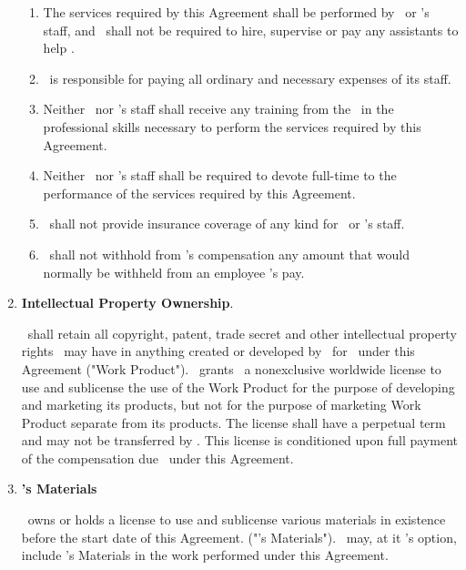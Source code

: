 \documentclass[a4paper,10pt,notitlepage,twocolumn]{article}
\begin{document}
\begin{enumerate}
\begin{enumerate}
	\item  The services required by this Agreement shall be performed by \cntrref\, or \cntrref 's staff, and \clref\ shall not be required to hire, supervise or pay any assistants to help \cntrref .

	\item  \cntrref\ is responsible for paying all ordinary and necessary expenses of its staff.

	\item  Neither \cntrref\ nor \cntrref 's staff shall receive any training from the \clref\ in the professional skills necessary to perform the services required by this Agreement.

	\item  Neither \cntrref\ nor \cntrref 's staff shall be required to devote full-time to the performance of the services required by this Agreement.

	\item  \clref\ shall not provide insurance coverage of any kind for \cntrref\ or \cntrref 's staff.

	\item  \clref\  shall not withhold from \cntrref 's compensation any amount that would normally be withheld from an employee 's pay.
\end{enumerate}


\item  \textbf{Intellectual Property Ownership}.
 
\cntrref\ shall retain all copyright, patent, trade secret and other intellectual property rights \cntrref\ may have in anything created or developed by \cntrref\ for \clref\ under this Agreement ("Work Product"). \cntrref\ grants \clref\ a nonexclusive worldwide license to use and sublicense the use of the Work Product for the purpose of developing and marketing its products, but not for the purpose of marketing Work Product separate from its products. The license shall have a perpetual term and may not be transferred by \clref . This license is conditioned upon full payment of the compensation due \cntrref\ under this Agreement.

\item \textbf{\cntrref 's Materials} 

\cntrref\ owns or holds a license to use and sublicense various materials in existence before the start date of this Agreement. ("\cntrref 's Materials"). \cntrref\ may, at it 's option, include \cntrref 's Materials in the work performed under this Agreement.



\end{enumerate}
\end{document}

